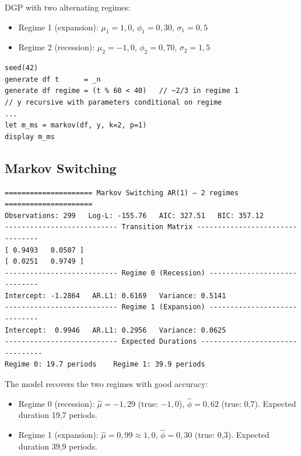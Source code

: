 DGP with two alternating regimes:
\begin{itemize}
  \item Regime 1 (expansion): $\mu_1 = 1{,}0$, $\phi_1 = 0{,}30$, $\sigma_1 = 0{,}5$
  \item Regime 2 (recession): $\mu_2 = -1{,}0$, $\phi_2 = 0{,}70$, $\sigma_2 = 1{,}5$
\end{itemize}

\begin{lstlisting}[caption={DGP Markov Switching AR(1) and estimation}]
seed(42)
generate df t      = _n
generate df regime = (t % 60 < 40)   // ~2/3 in regime 1
// y recursive with parameters conditional on regime
...
let m_ms = markov(df, y, k=2, p=1)
display m_ms
\end{lstlisting}

\subsection*{Markov Switching}

\begin{lstlisting}[language={}, basicstyle=\ttfamily\small,
  frame=none, numbers=none, backgroundcolor=\color{codbg},
  xleftmargin=0pt, xrightmargin=0pt, breaklines=false]
===================== Markov Switching AR(1) — 2 regimes =====================
Observations: 299   Log-L: -155.76   AIC: 327.51   BIC: 357.12
--------------------------- Transition Matrix --------------------------------
[ 0.9493   0.0507 ]
[ 0.0251   0.9749 ]
--------------------------- Regime 0 (Recession) -----------------------------
Intercept: -1.2864   AR.L1: 0.6169   Variance: 0.5141
--------------------------- Regime 1 (Expansion) -----------------------------
Intercept:  0.9946   AR.L1: 0.2956   Variance: 0.0625
--------------------------- Expected Durations --------------------------------
Regime 0: 19.7 periods    Regime 1: 39.9 periods
\end{lstlisting}

The model recovers the two regimes with good accuracy:
\begin{itemize}
  \item Regime 0 (recession): $\hat\mu = -1{,}29$ (true: $-1{,}0$),
  $\hat\phi = 0{,}62$ (true: 0{,}7). Expected duration 19{,}7 periods.
  \item Regime 1 (expansion): $\hat\mu = 0{,}99 \approx 1{,}0$,
  $\hat\phi = 0{,}30$ (true: 0{,}3). Expected duration 39{,}9 periods.
\end{itemize}

